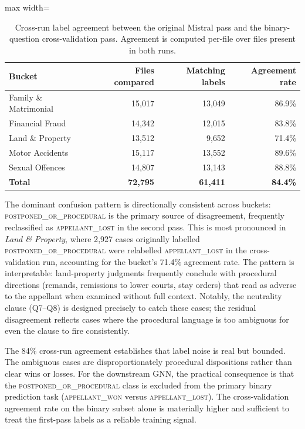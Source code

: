 \begin{table}[H]
  \centering
  \small
  \begin{adjustbox}{max width=\textwidth}
  \begin{tabular}{lrrr}
    \toprule
    Bucket & Files compared & Matching labels & Agreement rate \\
    \midrule
    Family \& Matrimonial & 15{,}017 & 13{,}049 & 86.9\% \\
    Financial Fraud       & 14{,}342 & 12{,}015 & 83.8\% \\
    Land \& Property      & 13{,}512 &  9{,}652 & 71.4\% \\
    Motor Accidents       & 15{,}117 & 13{,}552 & 89.6\% \\
    Sexual Offences       & 14{,}807 & 13{,}143 & 88.8\% \\
    \midrule
    \textbf{Total}        & \textbf{72{,}795} & \textbf{61{,}411} & \textbf{84.4\%} \\
    \bottomrule
  \end{tabular}
  \end{adjustbox}
  \caption{Cross-run label agreement between the original Mistral pass and the
  binary-question cross-validation pass. Agreement is computed per-file over
  files present in both runs.}
  \label{tab:crossval_agreement}
\end{table}

The dominant confusion pattern is directionally consistent across buckets:
\textsc{postponed\_or\_procedural} is the primary source of disagreement,
frequently reclassified as \textsc{appellant\_lost} in the second pass. This is
most pronounced in \emph{Land \& Property}, where 2{,}927 cases originally
labelled \textsc{postponed\_or\_procedural} were relabelled
\textsc{appellant\_lost} in the cross-validation run, accounting for the bucket's
71.4\% agreement rate. The pattern is interpretable: land-property judgments
frequently conclude with procedural directions (remands, remissions to lower
courts, stay orders) that read as adverse to the appellant when examined without
full context. Notably, the neutrality clause (Q7--Q8) is designed precisely to
catch these cases; the residual disagreement reflects cases where the procedural
language is too ambiguous for even the clause to fire consistently.

The 84\% cross-run agreement establishes that label noise is real but bounded.
The ambiguous cases are disproportionately procedural dispositions rather than
clear wins or losses. For the downstream GNN, the practical consequence is that
the \textsc{postponed\_or\_procedural} class is excluded from the primary binary
prediction task (\textsc{appellant\_won} versus \textsc{appellant\_lost}). The
cross-validation agreement rate on the binary subset alone is materially higher
and sufficient to treat the first-pass labels as a reliable training signal.

